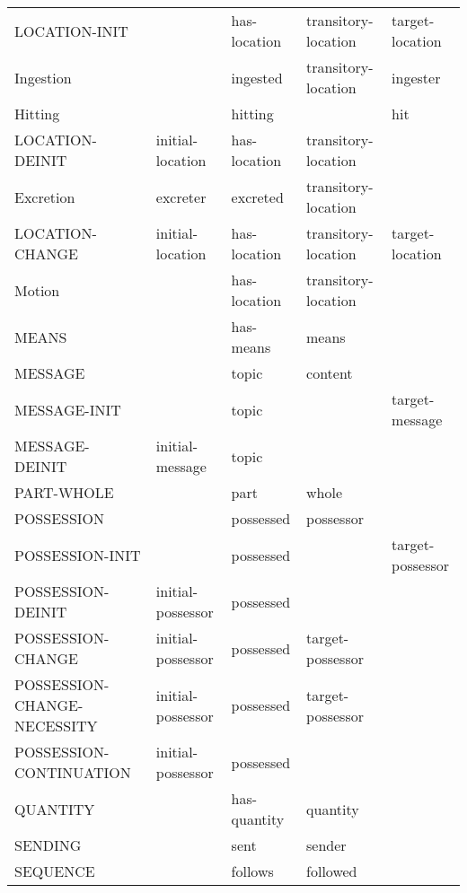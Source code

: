 \documentclass[a4paper]{article}
\newcommand{\fr}[1]{\textsf{#1}}
\newcommand{\rl}[1]{\textsf{#1}}
\begin{document}
\begin{table}
{\begin{tabular}{lllll}
            \fr{LOCATION-INIT} & & \rl{has-location} & \rl{transitory-location} & \rl{target-location} \\
            \fr{Ingestion} & & \rl{ingested} & \rl{transitory-location} & \rl{ingester} \\
            \fr{Hitting} & & \rl{hitting} & & \rl{hit} \\
            \fr{LOCATION-DEINIT} & \rl{initial-location} & \rl{has-location} & \rl{transitory-location} & \\
            \fr{Excretion} & \rl{excreter} & \rl{excreted} & \rl{transitory-location} & \\
            \fr{LOCATION-CHANGE} & \rl{initial-location} & \rl{has-location} & \rl{transitory-location} & \rl{target-location} \\
            \fr{Motion} & & \rl{has-location} & \rl{transitory-location} & \\
            \fr{MEANS} & & \rl{has-means} & \rl{means} & \\
            \fr{MESSAGE} & & \rl{topic} & \rl{content} & \\
            \fr{MESSAGE-INIT} & & \rl{topic} & & \rl{target-message} \\
            \fr{MESSAGE-DEINIT} & \rl{initial-message} & \rl{topic} & & \\
            \fr{PART-WHOLE} & & \rl{part} & \rl{whole} & \\
            \fr{POSSESSION} & & \rl{possessed} & \rl{possessor} & \\
            \fr{POSSESSION-INIT} & & \rl{possessed} & & \rl{target-possessor} \\
            \fr{POSSESSION-DEINIT} & \rl{initial-possessor} & \rl{possessed} & & \\
            \fr{POSSESSION-CHANGE} & \rl{initial-possessor} & \rl{possessed} & \rl{target-possessor} & \\
            \fr{POSSESSION-CHANGE-NECESSITY} & \rl{initial-possessor} & \rl{possessed} & \rl{target-possessor} & \\
            \fr{POSSESSION-CONTINUATION} & \rl{initial-possessor} & \rl{possessed} & & \\
            \fr{QUANTITY} & & \rl{has-quantity} & \rl{quantity} & \\
            \fr{SENDING} & & \rl{sent} & \rl{sender} & \\
            \fr{SEQUENCE} & & \rl{follows} & \rl{followed} & \\

\end{tabular}}
\end{table}
\end{document}
